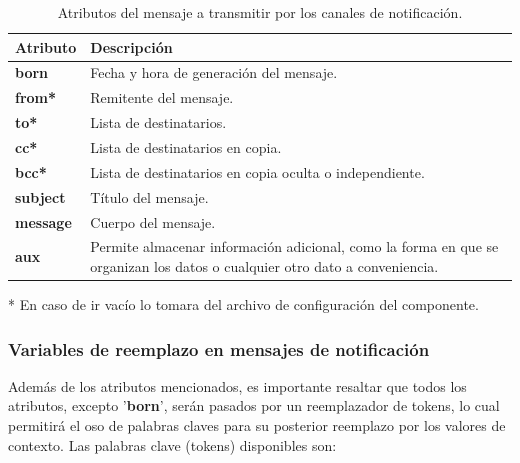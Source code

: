         \begin{table}[ht!]
        \caption[Atributos del mensaje a transmitir por los canales de notificación]{Atributos del mensaje a transmitir por los canales de notificación.}
        \label{Tab:MessageEstructureAttr}
        \centering
        \begin{tabular}{ | l p{11cm} | } 
            \hline
             \textbf{Atributo}  & \textbf{Descripción} \\ 
            \hline\hline
            \textbf{born}       & Fecha y hora de generación del mensaje. \\
            \hline
            \textbf{from*}      & Remitente del mensaje. \\
            \hline
            \textbf{to*}        & Lista de destinatarios. \\
            \hline
            \textbf{cc*}        & Lista de destinatarios en copia. \\
            \hline
            \textbf{bcc*}       & Lista de destinatarios en copia oculta o independiente. \\
            \hline
            \textbf{subject}    & Título del mensaje. \\
            \hline
            \textbf{message}    & Cuerpo del mensaje. \\
            \hline
            \textbf{aux}        & Permite almacenar información adicional, como la forma en que se organizan los datos o cualquier otro dato a conveniencia. \\
            \hline
        \end{tabular}
        * En caso de ir vacío lo tomara del archivo de configuración del componente.
        \end{table}
        
        \subsubsection{Variables de reemplazo en mensajes de notificación}
        \label{sub2:MessageTokens}
            Además de los atributos mencionados, es importante resaltar que todos los atributos, excepto '\textbf{born}', serán pasados por un reemplazador de tokens, lo cual permitirá el oso de palabras claves para su posterior reemplazo por los valores de contexto. Las palabras clave (tokens) disponibles son:
        
